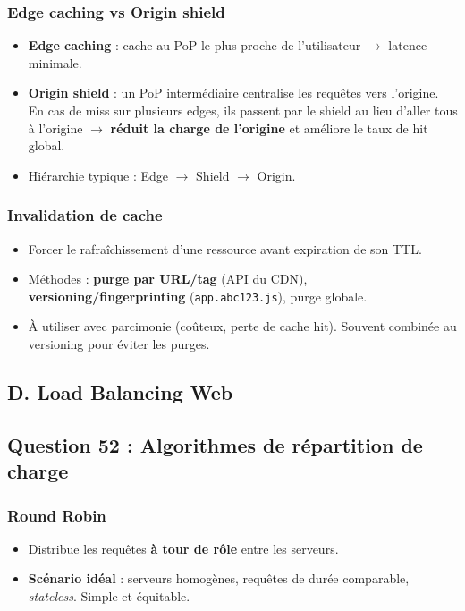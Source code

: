 \documentclass[12pt,a4paper]{article}
\begin{document}
\subsubsection*{Edge caching vs Origin shield}
\begin{itemize}
  \item \textbf{Edge caching} : cache au PoP le plus proche de l'utilisateur $\rightarrow$ latence minimale.
  \item \textbf{Origin shield} : un PoP interm\'ediaire centralise les requ\^etes vers l'origine. En cas de miss sur plusieurs edges, ils passent par le shield au lieu d'aller tous \`a l'origine $\rightarrow$ \textbf{r\'eduit la charge de l'origine} et am\'eliore le taux de hit global.
  \item Hi\'erarchie typique : Edge $\rightarrow$ Shield $\rightarrow$ Origin.
\end{itemize}

\subsubsection*{Invalidation de cache}
\begin{itemize}
  \item Forcer le rafra\^ichissement d'une ressource avant expiration de son TTL.
  \item M\'ethodes : \textbf{purge par URL/tag} (API du CDN), \textbf{versioning/fingerprinting} (\texttt{app.abc123.js}), purge globale.
  \item \`A utiliser avec parcimonie (co\^uteux, perte de cache hit). Souvent combin\'ee au versioning pour \'eviter les purges.
\end{itemize}

\subsection*{D. Load Balancing Web}
\subsection*{Question 52 : Algorithmes de r\'epartition de charge}


\subsubsection*{Round Robin}
\begin{itemize}
  \item Distribue les requ\^etes \textbf{\`a tour de r\^ole} entre les serveurs.
  \item \textbf{Sc\'enario id\'eal} : serveurs homog\`enes, requ\^etes de dur\'ee comparable, \textit{stateless}. Simple et \'equitable.
\end{itemize}
\end{document}
